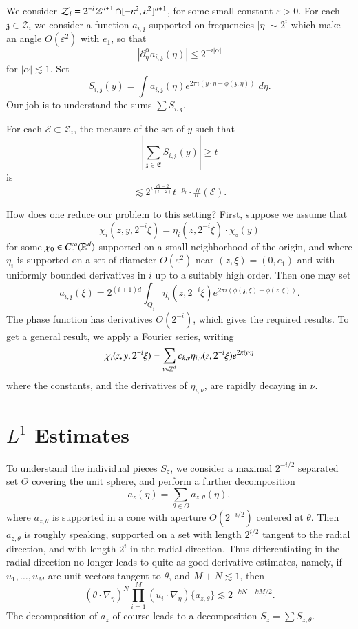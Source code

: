 We consider $\mathcal{Z}_i = 2^{-i} \operatorname{\mathbb{Z}}^{d+1} \cap [-\varepsilon^2,\varepsilon^2]^{d+1}$, for some small constant $\varepsilon > 0$. For each $\mathfrak{z} \in \mathcal{Z}_i$ we consider a function $a_{i,\mathfrak{z}}$ supported on frequencies $|\eta| \sim 2^i$ which make an angle $O(\varepsilon^2)$ with $e_1$, so that
%
\[ |\partial_\eta^\alpha a_{i,\mathfrak{z}}(\eta)| \leq 2^{-i |\alpha|} \]
%
for $|\alpha| \lesssim 1$. Set
%
\[ S_{i,\mathfrak{z}}(y) = \int a_{i,\mathfrak{z}}(\eta) e^{2 \pi i (y \cdot \eta - \phi(\mathfrak{z},\eta))}\; d\eta. \]
%
Our job is to understand the sums $\sum S_{i,\mathfrak{z}}$.

\begin{lemma}
    For each $\mathcal{E} \subset \mathcal{Z}_i$, the measure of the set of $y$ such that
    \[ | \sum_{\mathfrak{z} \in \mathfrak{E}} S_{i,\mathfrak{z}}(y) | \geq t \]
    is
    \[ \lesssim 2^{i \frac{dl - 2}{(l+2)}} t^{- p_l} \cdot \#(\mathcal{E}). \]
\end{lemma}

How does one reduce our problem to this setting? First, suppose we assume that
%
\[ \chi_i(z,y,2^{-i} \xi) = \eta_i(z, 2^{-i} \xi) \cdot \chi_\circ(y) \]
%
for some $\chi_0 \in C_c^\infty(\operatorname{\mathbb{R}}^d)$ supported on a small neighborhood of the origin, and where $\eta_i$ is supported on a set of diameter $O(\varepsilon^2)$ near $(z,\xi) = (0,e_1)$ and with uniformly bounded derivatives in $i$ up to a suitably high order. Then one may set
%
\[ a_{i,\mathfrak{z}}(\xi) = 2^{(i+1)d} \int_{Q_{\mathfrak{z}}} \eta_i(z, 2^{-i} \xi) e^{2 \pi i (\phi(\mathfrak{z},\xi) - \phi(z,\xi))}. \]
%
The phase function has derivatives $O(2^{-i})$, which gives the required results. To get a general result, we apply a Fourier series, writing
%
\[ \chi_i(z,y,2^{-i} \xi) = \sum_{\nu \in \operatorname{\mathbb{Z}}^d} c_{k,\nu} \eta_{i,\nu}(z, 2^{-i} \xi) e^{2 \pi i y \cdot \eta} \]
%
where the constants, and the derivatives of $\eta_{i,\nu}$, are rapidly decaying in $\nu$.

\section{$L^1$ Estimates}

To understand the individual pieces $S_z$, we consider a maximal $2^{-i/2}$ separated set $\Theta$ covering the unit sphere, and perform a further decomposition
%
\[ a_z(\eta) = \sum_{\theta \in \Theta} a_{z,\theta}(\eta), \]
%
where $a_{z,\theta}$ is supported in a cone with aperture $O(2^{-i/2})$ centered at $\theta$. Then $a_{z,\theta}$ is roughly speaking, supported on a set with length $2^{i/2}$ tangent to the radial direction, and with length $2^i$ in the radial direction. Thus differentiating in the radial direction no longer leads to quite as good derivative estimates, namely, if $u_1,\dots,u_{M}$ are unit vectors tangent to $\theta$, and $M + N \lesssim 1$, then
%
\[ (\theta \cdot \nabla_\eta)^N \prod_{i = 1}^M (u_i \cdot \nabla_\eta) \{ a_{z,\theta} \} \lesssim 2^{-k N - k M / 2}. \]
%
The decomposition of $a_z$ of course leads to a decomposition $S_z = \sum S_{z,\theta}$.

